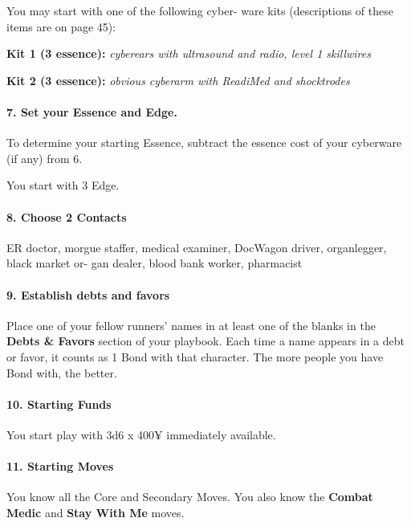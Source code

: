 \begin{multicols}{3}
You may start with one of the following cyber-
ware kits (descriptions of these items are on
page 45):

\textbf{Kit 1 (3 essence):} \textit{cyberears with ultrasound
and radio, level 1 skillwires}

\textbf{Kit 2 (3 essence):} \textit{obvious cyberarm with
ReadiMed and shocktrodes}


\paragraph{7.  Set your Essence and Edge.}

To determine your starting Essence, subtract the
essence cost of your cyberware (if any) from 6.

You start with 3 Edge.

\paragraph{8.  Choose 2 Contacts}

ER doctor, morgue staffer, medical examiner,
DocWagon driver, organlegger, black market or-
gan dealer, blood bank worker, pharmacist

\paragraph{9.  Establish debts and favors}

Place one of your fellow runners’ names in at
least one of the blanks in the \textbf{Debts \& Favors}
section of your playbook. Each time a name
appears in a debt or favor, it counts as 1 Bond
with that character. The more people you have
Bond with, the better.

\paragraph{10.  Starting Funds}

You start play with 3d6 x 400¥ immediately
available.

\paragraph{11.  Starting Moves}

You know all the Core and Secondary Moves.
You also know the \textbf{Combat Medic} and
\textbf{Stay With Me} moves.

\end{multicols}

